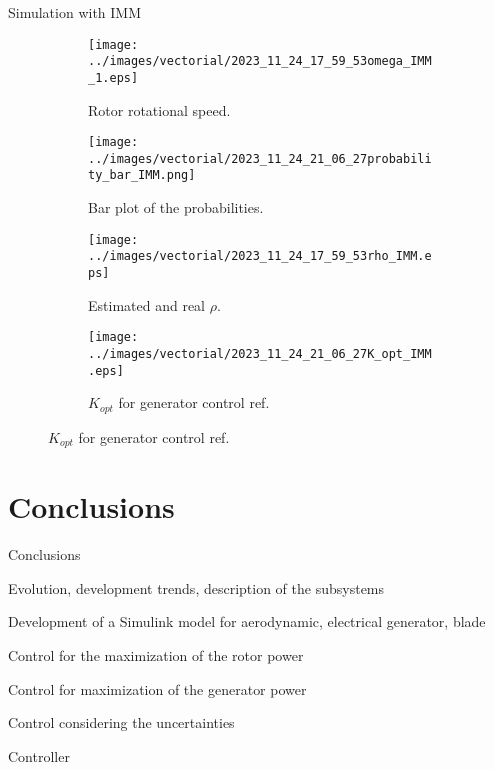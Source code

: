 \begin{frame}{Simulation with IMM}
  \begin{figure}[!htbp]
    \begin{subfigure}{0.49\columnwidth}
      \centering
      \texttt{[image: ../images/vectorial/2023\_11\_24\_17\_59\_53omega\_IMM\_1.eps]}
      \caption{Rotor rotational speed.}
    \end{subfigure}
    \begin{subfigure}{0.49\columnwidth}
      \centering
      \texttt{[image: ../images/vectorial/2023\_11\_24\_21\_06\_27probability\_bar\_IMM.png]}
      \caption{Bar plot of the probabilities.}
    \end{subfigure}
    \begin{subfigure}{0.49\columnwidth}
      \centering
      \texttt{[image: ../images/vectorial/2023\_11\_24\_17\_59\_53rho\_IMM.eps]}
      \caption{Estimated and real $\rho$.}
    \end{subfigure}
    \begin{subfigure}{0.49\columnwidth}
      \centering
      \texttt{[image: ../images/vectorial/2023\_11\_24\_21\_06\_27K\_opt\_IMM.eps]}
      \caption{$K_{opt}$ for generator control ref. }
    \end{subfigure}
  \end{figure}
\end{frame}

                                                      
\section{Conclusions}
\begin{frame}{Conclusions}
  \begin{myitemize}
    \item Evolution, development trends, description of the subsystems
    \item Development of a Simulink model for aerodynamic, electrical generator, blade 
    \item Control for the maximization of the rotor power
    \item Control for maximization of the generator power
    \item Control considering the uncertainties
  \end{myitemize}
\end{frame}



\begin{frame}{Controller}
  
\end{frame}